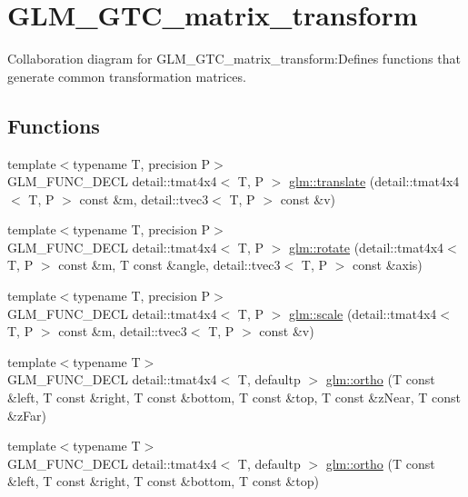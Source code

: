 \hypertarget{group__gtc__matrix__transform}{
\section{GLM\_\-GTC\_\-matrix\_\-transform}
\label{group__gtc__matrix__transform}
}


Collaboration diagram for GLM\_\-GTC\_\-matrix\_\-transform:Defines functions that generate common transformation matrices.  
\subsection*{Functions}
\begin{CompactItemize}
\item 
{\footnotesize template$<$typename T, precision P$>$ }\\GLM\_\-FUNC\_\-DECL detail::tmat4x4$<$ T, P $>$ \hyperlink{group__gtc__matrix__transform_gb05e6ebabf535a3d8f9d9bfc3df45143}{glm::translate} (detail::tmat4x4$<$ T, P $>$ const \&m, detail::tvec3$<$ T, P $>$ const \&v)
\item 
{\footnotesize template$<$typename T, precision P$>$ }\\GLM\_\-FUNC\_\-DECL detail::tmat4x4$<$ T, P $>$ \hyperlink{group__gtc__matrix__transform_g1a75da872120125437265872423e0b14}{glm::rotate} (detail::tmat4x4$<$ T, P $>$ const \&m, T const \&angle, detail::tvec3$<$ T, P $>$ const \&axis)
\item 
{\footnotesize template$<$typename T, precision P$>$ }\\GLM\_\-FUNC\_\-DECL detail::tmat4x4$<$ T, P $>$ \hyperlink{group__gtc__matrix__transform_g5e2bf1cdf124863558884751d611aea6}{glm::scale} (detail::tmat4x4$<$ T, P $>$ const \&m, detail::tvec3$<$ T, P $>$ const \&v)
\item 
{\footnotesize template$<$typename T$>$ }\\GLM\_\-FUNC\_\-DECL detail::tmat4x4$<$ T, defaultp $>$ \hyperlink{group__gtc__matrix__transform_gf420978f35ff47883f417cef1e4d6a15}{glm::ortho} (T const \&left, T const \&right, T const \&bottom, T const \&top, T const \&zNear, T const \&zFar)
\item 
{\footnotesize template$<$typename T$>$ }\\GLM\_\-FUNC\_\-DECL detail::tmat4x4$<$ T, defaultp $>$ \hyperlink{group__gtc__matrix__transform_gdab1dbf2b9ceda856624bafa09b3de07}{glm::ortho} (T const \&left, T const \&right, T const \&bottom, T const \&top)
\item 

\end{CompactItemize}
